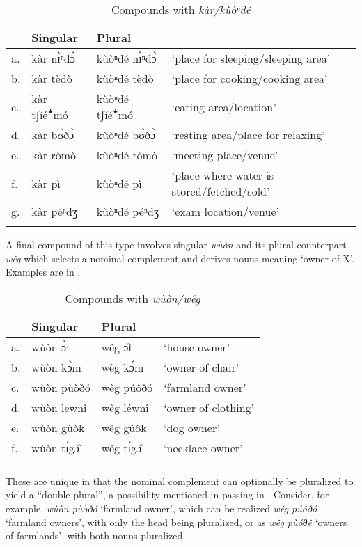 \documentclass[output=paper,colorlinks,citecolor=brown]{langscibook}
\begin{document}
\begin{table}
\caption{Compounds with \textit{kàr/kùòⁿdé}}
\label{tab:KarCompound}
 \begin{tabular}{llll}
  \lsptoprule
& Singular & Plural &  \\
\midrule
a.	&kàr nɪ̀ⁿdɔ̀&	kùòⁿdé nɪ̀ⁿdɔ̀	&`place  for sleeping/sleeping area'\\
b.&	kàr tèdò&	kùòⁿdé tèdò	&`place for cooking/cooking area'\\
c.	&kàr tʃíéꜜmó	&kùòⁿdé tʃíéꜜmó	&`eating area/location'\\
d.	&kàr bʊ̀ðɔ̀	&kùòⁿdé bʊ̀ðɔ̀	&`resting area/place for relaxing'\\
e.&	kàr ròmò	&kùòⁿdé ròmò	&`meeting place/venue'\\
f.&	kàr pì	&kùòⁿdé pì	&`place where water is stored/fetched/sold'\\
g.	&kàr péᶮdʒ&	kùòⁿdé péᶮdʒ	&`exam location/venue'\\
  \lspbottomrule
 \end{tabular}
\end{table}  

A final compound of this type involves singular \textit{wùòn} and its plural counterpart \textit{wêg} which selects a nominal complement and derives nouns meaning `owner of X'. Examples are in .

\begin{table}
\caption{Compounds with \textit{wùòn/wêg}}
\label{tab:WuonCompound}
 \begin{tabular}{llll}
  \lsptoprule
& Singular & Plural &  \\
\midrule
a.	&wùòn ɔ̀t	&wêg ɔ̂t	&`house owner'\\
b.&	wùòn kɔ̀m&	wêg kɔ́m	&`owner of chair'\\
c.&	wùòn pùòðó	&wêg púôðó	&`farmland owner'\\
d.&	wùòn lewni	&wêg léwnî	&`owner of clothing'\\
e.&	wùòn gùòk	&wêg gúôk	&`dog owner'\\
f.	&wùòn tɪ́gɔ̂	&wêg tɪ́gɔ̂&	`necklace owner'\\
  \lspbottomrule
 \end{tabular}
\end{table}  

These are unique in that the nominal complement can optionally be pluralized to yield a ``double plural'', a possibility mentioned in passing in \citet{Gregersen1961}. Consider, for example, \textit{wùòn pùòðó} `farmland owner', which can be realized \textit{wêg púôðó} `farmland owners', with only the head being pluralized, or as \textit{wêg pùóθê} `owners of farmlands', with both nouns pluralized. 
\end{document}
